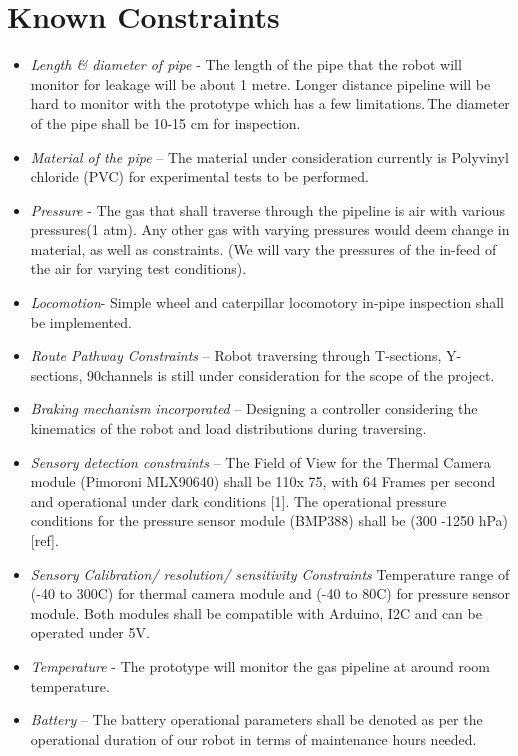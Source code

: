 \documentclass[a4paper]{article}
\begin{document}
\section{Known Constraints}
\begin{itemize}
    \item {\textit{Length \& diameter of pipe} - The length of the pipe that the robot will monitor for leakage will be about 1 metre. Longer distance pipeline will be hard to monitor with the prototype which has a few limitations. The diameter of the pipe shall be 10-15 cm for inspection.}
    \item{\textit{Material of the pipe} – The material under consideration currently is Polyvinyl chloride (PVC) for experimental tests to be performed.}
    \item{\textit{Pressure} - The gas that shall traverse through the pipeline is air with various pressures(1 atm). Any other gas with varying pressures would deem change in material, as well as constraints. (We will vary the pressures of the in-feed of the air for varying test conditions).}
    \item{\textit{Locomotion}- Simple wheel and caterpillar locomotory in-pipe inspection shall be implemented.}
    \item{\textit{Route Pathway Constraints} – Robot traversing through T-sections, Y-sections, 90\degree channels is still under consideration for the scope of the project.}
    \item{\textit{Braking mechanism incorporated} – Designing a controller considering the kinematics of the robot and load distributions during traversing.}
    \item{\textit{Sensory detection constraints} – The Field of View for the Thermal Camera module (Pimoroni MLX90640) shall be 110\degree x 75\degree, with 64 Frames per second and operational under dark conditions [1]. The operational pressure conditions for the pressure sensor module (BMP388) shall be (300 -1250 hPa) [ref].}
    \item{\textit{Sensory Calibration/ resolution/ sensitivity Constraints} Temperature range of (-40 to 300\degree C) for thermal camera module and (-40 to 80\degree C) for pressure sensor module. Both modules shall be compatible with Arduino, I2C and can be operated under 5V. }
    \item{\textit{Temperature} - The prototype will monitor the gas pipeline at around room temperature.}
    \item{\textit{Battery} – The battery operational parameters shall be denoted as per the operational duration of our robot in terms of maintenance hours needed.}

\end{itemize}
\end{document}
